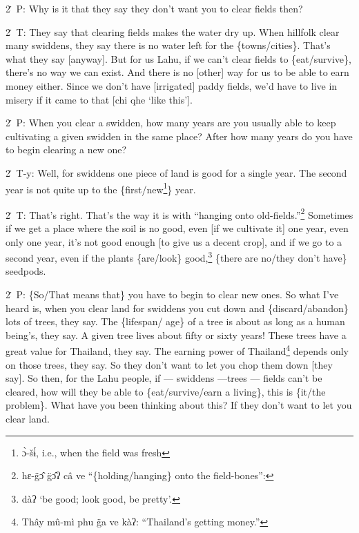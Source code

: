 2\. P: Why is it that they say they don't want you to clear fields then?

2\. T: They say that clearing fields makes the water dry up. When hillfolk clear
many swiddens, they say there is no water left for the \{towns/cities\}. That's
what they say [anyway]. But for us Lahu, if we can't clear fields to \{eat/survive\},
there's no way we can exist. And there is no [other] way for us to be able to earn
money either. Since we don't have [irrigated] paddy fields, we'd have to live in
misery if it came to that [chi qhe `like this'].

2\. P: When you clear a swidden, how many years are you usually able to keep cultivating
a given swidden in the same place? After how many years do you have to begin clearing
a new one?

2\. T-y: Well, for swiddens one piece of land is good for a single year. The second
year is not quite up to the \{first/new\footnote{ɔ̀-šɨ́, i.e., when the field was fresh}\} year.

2\. T: That's right. That's the way it is with ``hanging onto old-fields.''\footnote{hɛ-g̈ɔ̂ g̈ɔ̂ʔ câ ve ``\{holding/hanging\} onto the field-bones'':}
Sometimes if we get a place where the soil is no good, even [if we cultivate it]
one year, even only one year, it's not good enough [to give us a decent crop],
and if we go to a second year, even if the plants \{are/look\} good,\footnote{dàʔ `be good; look good, be pretty'.} \{there
are no/they don't have\} seedpods.

2\. P: \{So/That means that\} you have to begin to clear new ones. So what I've
heard is, when you clear land for swiddens you cut down and \{discard/abandon\}
lots of trees, they say. The \{lifespan/ age\} of a tree is about as long as a
human being's, they say. A given tree lives about fifty or sixty years! These trees
have a great value for Thailand, they say. The earning power of Thailand\footnote{Thây mû-mì phu g̈a ve kàʔ: ``Thailand's getting money.''} depends
only on those trees, they say. So they don't want to let you chop them down [they
say]. So then, for the Lahu people, if --- swiddens ---trees --- fields can't be
cleared, how will they be able to \{eat/survive/earn a living\}, this is \{it/the
problem\}. What have you been thinking about this? If they don't want to let you
clear land.

